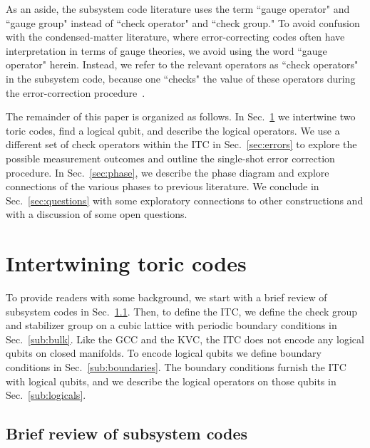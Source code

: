 As an aside, the subsystem code literature uses the term ``gauge operator" and ``gauge group" instead of ``check operator" and ``check group." To avoid confusion with the condensed-matter literature, where error-correcting codes often have interpretation in terms of gauge theories, we avoid using the word ``gauge operator" herein. Instead, we refer to the relevant operators as ``check operators" in the subsystem code, because one ``checks" the value of these operators during the error-correction procedure~\cite{HastingsHaah2021}.

The remainder of this paper is organized as follows. In Sec.~\ref{sec:build} we intertwine two toric codes, find a logical qubit, and describe the logical operators. We use a different set of check operators within the ITC in Sec.~\ref{sec:errors} to explore the possible measurement outcomes and outline the single-shot error correction procedure. In Sec.~\ref{sec:phase}, we describe the phase diagram and explore connections of the various phases to previous literature. We conclude in Sec.~\ref{sec:questions} with some exploratory connections to other constructions and with a discussion of some open questions.

\section{Intertwining toric codes} \label{sec:build}

To provide readers with some background, we start with a brief review of subsystem codes in Sec.~\ref{sub:subsystem}. Then, to define the ITC, we define the check group and stabilizer group on a cubic lattice with periodic boundary conditions in Sec.~\ref{sub:bulk}. Like the GCC and the KVC, the ITC does not encode any logical qubits on closed manifolds. To encode logical qubits we define boundary conditions in Sec.~\ref{sub:boundaries}. The boundary conditions furnish the ITC with logical qubits, and we describe the logical operators on those qubits in Sec.~\ref{sub:logicals}.

\subsection{Brief review of subsystem codes} \label{sub:subsystem}

